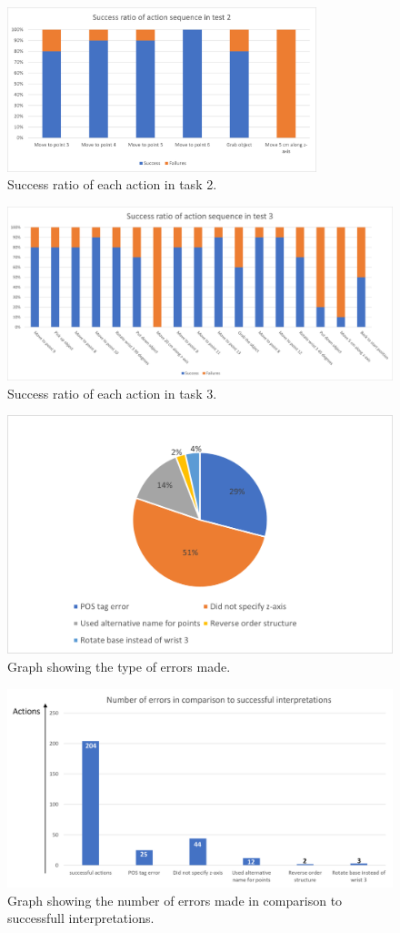 \begin{figure}[ht]
    \centering
    \includegraphics[width=9cm]{img/test_results_2.png}
    \caption{Success ratio of each action in task 2.}
    \label{fig:eval_test_2}
\end{figure}

\begin{figure}[ht]
    \centering
    \includegraphics[width=16cm]{img/test_results_3.png}
    \caption{Success ratio of each action in task 3.}
    \label{fig:eval_test_3}
\end{figure}


\begin{figure}[ht]
    \centering
    \includegraphics[width=12cm]{img/Error_types.png}
    \caption{Graph showing the type of errors made.}
    \label{fig:error}
\end{figure}


\begin{figure}[ht]
    \centering
    \includegraphics[width=12cm]{img/errors_numerical.png}
    \caption{Graph showing the number of errors made in comparison to successfull interpretations.}
    \label{fig:error_num}
\end{figure}

